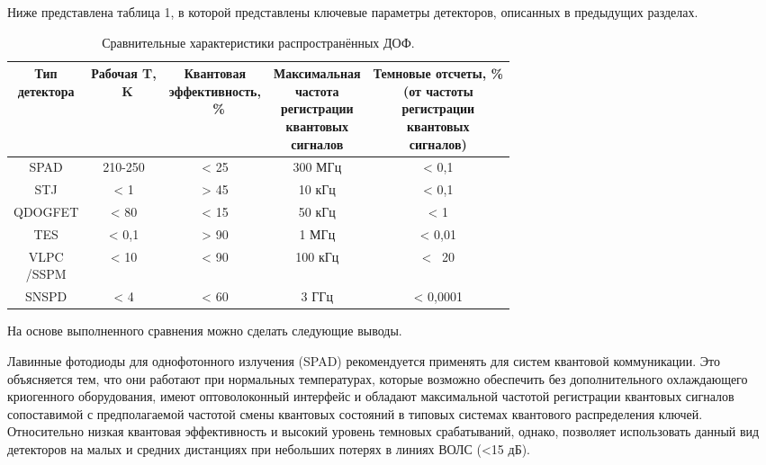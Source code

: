 Ниже представлена таблица 1, в которой представлены ключевые параметры детекторов, описанных в предыдущих разделах.

\begin{table} [htbp]
	\centering
	\caption{Сравнительные характеристики распространённых ДОФ.}
	\label{tab:SPD_compare}
	\begin{tabular}{| c | c | c | c | c |}
	
	 \hline \makecell{Тип \\детектора} & \makecell{Рабочая T,\\~K} & \makecell{Квантовая \\эффективность,\\~\%} & \makecell{Максимальная \\частота \\регистрации \\квантовых \\сигналов} & \makecell{Темновые отсчеты, \% \\(от частоты \\регистрации \\квантовых \\сигналов)}   \\ \hline
	  SPAD         & 210-250    & < 25    & 300 МГц     & < 0,1   \\ \hline
	  STJ	   	   & < 1        & > 45    & 10 кГц  	& < 0,1      \\ \hline
	  QDOGFET      & < 80       & < 15    & 50 кГц      & < 1       \\ \hline
	  TES          & < 0,1      & > 90    & 1 МГц       & < 0,01       \\ \hline
	  \makecell{VLPC\\/SSPM} & < 10      & < 90    & 100 кГц       & < ~20      \\ \hline
	  SNSPD          & < 4      & < 60    & 3 ГГц       & < 0,0001       \\ \hline
	  
	\end{tabular}
\end{table}

На основе выполненного сравнения можно сделать следующие выводы. 


Лавинные фотодиоды для однофотонного излучения (SPAD) рекомендуется применять для систем квантовой коммуникации. Это объясняется тем, что они работают при нормальных температурах, которые возможно обеспечить без дополнительного охлаждающего криогенного оборудования, имеют оптоволоконный интерфейс и обладают максимальной частотой регистрации квантовых сигналов сопоставимой с  предполагаемой частотой смены квантовых состояний в типовых системах квантового распределения ключей. Относительно низкая квантовая эффективность и высокий уровень темновых срабатываний, однако, позволяет использовать данный вид детекторов на малых и средних дистанциях при небольших потерях в линиях ВОЛС (<15 дБ).


